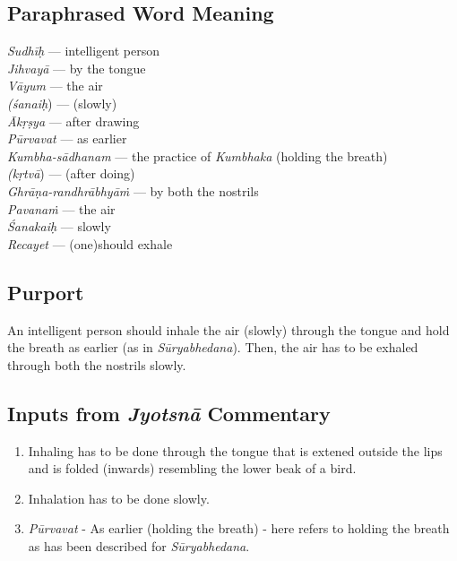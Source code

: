 \subsection*{Paraphrased Word Meaning}
\vspace{-10pt}

\begin{multicols}{2}
\textit{Sudhīḥ} --- intelligent person \\
\textit{Jihvayā} --- by the tongue \\
\textit{Vāyum} --- the air \\
\textit{(śanaiḥ}) --- (slowly)\\
\textit{Ākṛṣya} --- after drawing \\
\textit{Pūrvavat} --- as earlier \\
\textit{Kumbha-sādhanam} --- the practice of \textit{Kumbhaka} (holding the breath)\\
\textit{(kṛtvā}) --- (after doing)\\
\textit{Ghrāṇa-randhrābhyāṁ} --- by both the nostrils \\
\textit{Pavanaṁ} --- the air \\
\textit{Śanakaiḥ} --- slowly \\
\textit{Recayet} --- (one)should exhale
\end{multicols}

\subsection*{Purport}


An intelligent person should inhale the air (slowly) through the tongue and hold the breath as earlier (as in \textit{Sūryabhedana}). Then, the air has to be exhaled through both the nostrils slowly.

\subsection*{Inputs from \textit{Jyotsnā} Commentary}
\vspace{-10pt}

\begin{enumerate}
\itemsep=0pt
\item Inhaling has to be done through the tongue that is extened outside the lips and is folded (inwards) resembling the lower beak of a bird.
\item Inhalation has to be done slowly.
\item \textit{Pūrvavat} - As earlier (holding the breath) - here refers to holding the breath as has been described for \textit{Sūryabhedana}. 
\end{enumerate}

